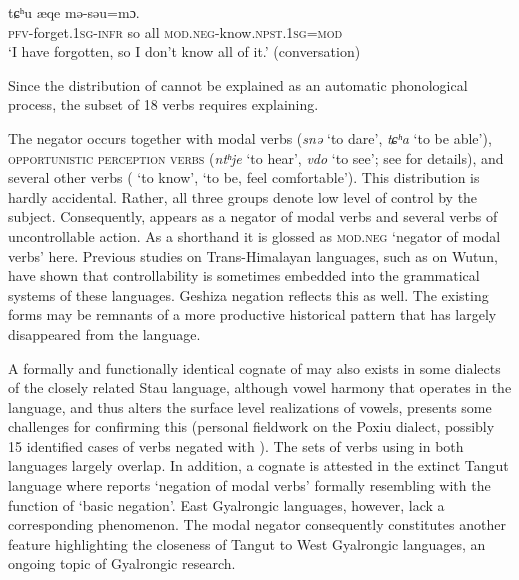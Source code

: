 \documentclass[output=paper,colorlinks,citecolor=brown]{langscibook}
\begin{document}
\ea
\label{dev}
  {tɕʰu}  {æqe}  {mə-səu=mɔ.}\\
\textsc{pfv}-forget.\textsc{1sg-infr}    so	all	\textsc{mod.neg}-know.\textsc{npst.1sg=mod}\\ 
\glt `I have forgotten, so I don't know all of it.' (conversation)
\z

\z

Since the distribution of  cannot be explained as an automatic phonological process, the subset of 18 verbs requires explaining. 

The negator occurs together with modal verbs (\textit{snə} ‘to dare’, \textit{tɕʰa} ‘to be able’), \textsc{opportunistic perception verbs} (\textit{ntʰje} ‘to hear’,  \textit{vdo} ‘to see’; see \citealt[647]{Honkasalo2019} for details), and several other verbs ( `to know',  `to be, feel comfortable'). This distribution is hardly accidental. Rather, all three groups denote low level of control by the subject. Consequently,  appears as a negator of modal verbs and several verbs of uncontrollable action. As a shorthand it is glossed as \textsc{mod.neg} `negator of modal verbs' here. Previous studies on Trans-Himalayan languages, such as \citet{Sandman2016} on Wutun, have shown that controllability is sometimes embedded into the grammatical systems of these languages. Geshiza negation reflects this as well. The existing forms may be remnants of a more productive historical pattern that has largely disappeared from the language.

A formally and functionally identical cognate of  may also exists in some dialects of the closely related Stau language, although vowel harmony that operates in the language, and thus alters the surface level realizations of vowels, presents some challenges for confirming this (personal fieldwork on the Poxiu dialect, possibly 15 identified cases of verbs negated with ). The sets of verbs using  in both languages largely overlap. In addition, a cognate is attested in the extinct Tangut language where \citet{Jacques2011} reports  ‘negation of modal verbs’ formally resembling  with the function of ‘basic negation’. East Gyalrongic languages, however, lack a corresponding phenomenon. The modal negator consequently constitutes another feature highlighting the closeness of Tangut to West Gyalrongic languages, an ongoing topic of Gyalrongic research.
\end{document}
